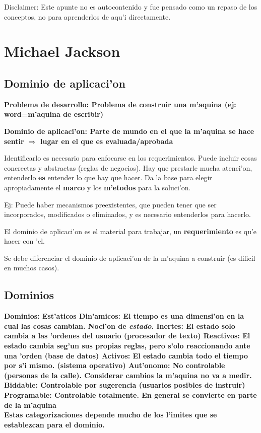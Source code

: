\documentclass[a4paper,spanish]{article}
\newcommand{\tab}{\hspace*{1cm}}
\newcommand{\defi}[2]{\bfseries #1: \mdseries #2}
\newcommand{\ldefi}[1]{\bfseries #1: \mdseries}
\newcommand{\sndefi}[1]{\newline \tab \bfseries #1 \mdseries}
\newcommand{\sdefi}[2]{\newline \tab \bfseries #1: \mdseries #2}
\newcommand{\ssdefi}[2]{\newline \tab\tab \bfseries #1: \mdseries #2}
\newcommand{\sssdefi}[2]{\newline \tab\tab\tab \bfseries #1: \mdseries #2}
\begin{document}
Disclaimer: Este apunte no es autocontenido y fue pensado como un repaso de los conceptos, 
no para aprenderlos de aqu'i directamente.

\section{Michael Jackson}

\subsection{Dominio de aplicaci'on}

\defi{Problema de desarrollo}{Problema de construir una m'aquina (ej: word=m'aquina de escribir)}

\defi{Dominio de aplicaci'on}{Parte de mundo en el que la m'aquina se hace sentir $\Rightarrow$ lugar en el
que es evaluada/aprobada}

Identificarlo es necesario para enfocarse en los requerimientos. Puede incluir cosas concrectas y 
abstractas (reglas de negocios). Hay que prestarle mucha atenci'on, entenderlo \textbf{es} entender 
lo que hay que hacer. Da la base para elegir apropiadamente el \textbf{marco} y los \textbf{m'etodos}
para la soluci'on.

Ej: Puede haber mecanismos preexistentes, que pueden tener que ser incorporados, modificados o
eliminados, y es necesario entenderlos para hacerlo.

El dominio de aplicaci'on es el material para trabajar, un \textbf{requerimiento} es qu'e hacer
con 'el.

Se debe diferenciar el dominio de aplicaci'on de la m'aquina a construir (es dificil en muchos casos).

\subsection{Dominios}

\ldefi{Dominios}
\sndefi{Est'aticos}
\sdefi{Din'amicos}{El tiempo es una dimensi'on en la cual las cosas cambian. Noci'on de \textit{estado}.}
\ssdefi{Inertes}{El estado solo cambia a las 'ordenes del usuario (procesador de texto)}
\ssdefi{Reactivos}{El estado cambia seg'un sus propias reglas, pero s'olo reaccionando ante una 'orden (base de datos)}
\ssdefi{Activos}{El estado cambia todo el tiempo por s'i mismo. (sistema operativo)}
\sssdefi{Aut'onomo}{No controlable (personas de la calle). Considerar cambios la m'aquina no va a medir.}
\sssdefi{Biddable}{Controlable por sugerencia (usuarios posibles de instruir)}
\sssdefi{Programable}{Controlable totalmente. En general se convierte en parte de la m'aquina} \\
\tab\tab Estas categorizaciones depende mucho de los l'imites que se establezcan para el dominio.
\end{document}
